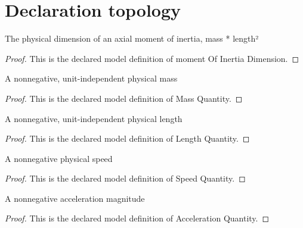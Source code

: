 \section{Declaration topology}
\begin{definition}
  \label{def:physics:phyx-mini-0775:phyxminiproblems-problemphyxmini0775-momentofinertiadimension}
  The physical dimension of an axial moment of inertia, mass * length²
\end{definition}
\begin{proof}
  This is the declared model definition of moment Of Inertia Dimension.
\end{proof}
\begin{definition}
  \label{def:physics:phyx-mini-0775:phyxminiproblems-problemphyxmini0775-massquantity}
  A nonnegative, unit-independent physical mass
\end{definition}
\begin{proof}
  This is the declared model definition of Mass Quantity.
\end{proof}
\begin{definition}
  \label{def:physics:phyx-mini-0775:phyxminiproblems-problemphyxmini0775-lengthquantity}
  A nonnegative, unit-independent physical length
\end{definition}
\begin{proof}
  This is the declared model definition of Length Quantity.
\end{proof}
\begin{definition}
  \label{def:physics:phyx-mini-0775:phyxminiproblems-problemphyxmini0775-speedquantity}
  A nonnegative physical speed
\end{definition}
\begin{proof}
  This is the declared model definition of Speed Quantity.
\end{proof}
\begin{definition}
  \label{def:physics:phyx-mini-0775:phyxminiproblems-problemphyxmini0775-accelerationquantity}
  A nonnegative acceleration magnitude
\end{definition}
\begin{proof}
  This is the declared model definition of Acceleration Quantity.
\end{proof}

